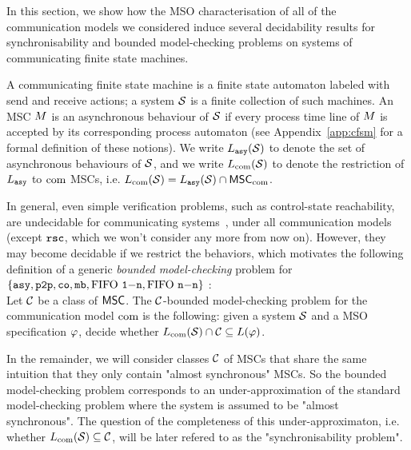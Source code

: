 

In this section, we show how the MSO characterisation of all of the communication
models we considered induce several decidability results for
synchronisability and bounded model-checking problems on systems of
communicating finite state machines.

A communicating finite state machine is a finite state automaton labeled with send
and receive actions; a system $\mathcal{S}$ is a finite collection of such machines.
An MSC $M$ is an asynchronous behaviour of $\mathcal{S}$ if every process
time line of $M$ is accepted by its corresponding process automaton
\ifappendix
(see Appendix~\ref{app:cfsm} for a formal definition of these notions).
\fi
We write $L_{\mathtt{asy}}(\mathcal{S})$ to denote the set of asynchronous behaviours of $\mathcal{S}$,
and we write $L_{\textup{com}}(\mathcal{S})$ to denote the restriction of $L_{\mathtt{asy}}$ to $\textup{com}$ MSCs,
i.e. $L_{\textup{com}}(\mathcal{S})=L_{\mathtt{asy}}(\mathcal{S})\cap\mathsf{MSC}_{\textup{com}}$.

In general, even simple verification problems, such
as control-state reachability, are undecidable for
communicating systems~\cite{DBLP:journals/jacm/BrandZ83}, under all communication models (except
$\mathtt{rsc}$, which we won't consider any more from now on).
However, they may become decidable if we restrict the behaviors, which motivates the following
definition of a generic \emph{bounded model-checking} problem for $\{\mathtt{asy}, \mathtt{p2p}, \mathtt{co}, \mathtt{mb}, \text{FIFO } \mathtt{1\mathsf{-}n}, \text{FIFO } \mathtt{n\mathsf{-}n} \}$ :\\

Let $\mathcal{C}$ be a class of $\mathsf{MSC}$. The $\mathcal{C}$-bounded model-checking problem
for the communication model $\textup{com}$ is the following: given a system $\mathcal{S}$ and a MSO
specification $\varphi$, decide whether
$L_{\textup{com}}(\mathcal{S})\cap \mathcal{C} \subseteq L(\varphi)$.

In the remainder, we will consider classes $\mathcal{C}$ of MSCs that share the same intuition
that they only contain "almost synchronous" MSCs. So the bounded model-checking problem
corresponds to an under-approximation of the standard model-checking problem where the
system is assumed to be "almost synchronous". The question of the completeness of this under-approximaton, 
i.e. whether $L_{\textup{com}}(\mathcal{S})\subseteq \mathcal{C}$, will be later
refered to as the "synchronisability problem".


